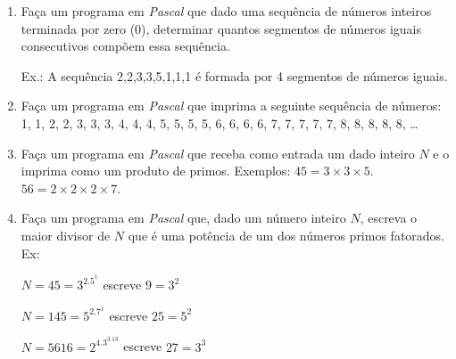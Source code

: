 \begin{enumerate}
\item 
Faça um  programa em \emph{Pascal} que dado
 uma sequência de números inteiros  terminada por zero (0), determinar
 quantos segmentos    de  números iguais consecutivos     compõem essa
 sequência.

Ex.: A sequência 2,2,3,3,5,1,1,1 é  formada por 4 segmentos de números
iguais.


\item Faça um programa em \emph{Pascal} que imprima a seguinte
sequência de números: 1, 1, 2, 2, 3, 3, 3, 4, 4, 4, 5, 5, 5, 5, 6, 6, 6, 6, 
7, 7, 7, 7, 7, 8, 8, 8, 8, 8, \ldots

\item Faça um programa em \emph{Pascal} que 
receba como entrada um dado 
inteiro $N$ e o imprima como um produto de primos. Exemplos:
$45 = 3 \times 3 \times 5$. $56 = 2 \times 2 \times 2 \times 7$.

\item Faça um programa em \emph{Pascal} que, dado
um número inteiro $N$, escreva o maior divisor de $N$ que é uma potência
de um dos números primos fatorados. Ex:

\hspace{2cm} $N=45 = 3^2.5^1 $ escreve $9=3^2$

\hspace{2cm} $N=145 = 5^2.7^1 $ escreve $25=5^2$

\hspace{2cm} $N=5616 = 2^4.3^3.13 $ escreve $27=3^3$

\end{enumerate}
